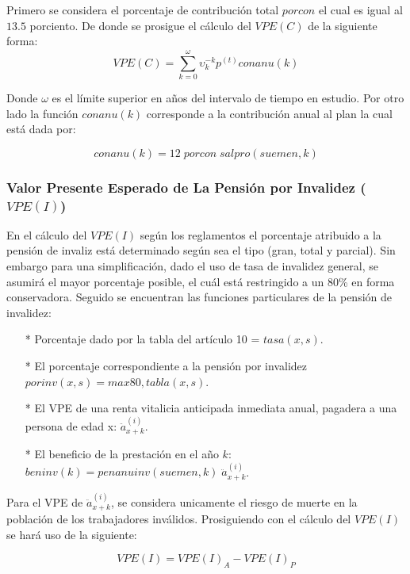 \documentclass[12pt,letterpaper,titlepage]{article}
\begin{document}
Primero se considera el porcentaje de contribución total $porcon$ el cual es igual al $13.5$ porciento. De donde se prosigue el cálculo del $V\!PE(C)$ de la siguiente forma:
\begin{equation*}
V\!PE(C)=\sum \limits_{k=0}^\omega \upsilon^{-k}_{k}p^{(t)} conanu(k)
\end{equation*}

Donde $\omega$ es el límite superior en años del intervalo de tiempo en estudio. Por otro lado la función $conanu(k)$ corresponde a la contribución anual al plan la cual está dada por:

\begin{equation*}
conanu(k)=12\;porcon\;sal\!pro(suemen,k)
\end{equation*}

\subsubsection{Valor Presente Esperado de La Pensión por Invalidez ($V\!PE(I)$)}

En el cálculo del $V\!PE(I)$ según los reglamentos el porcentaje atribuido a la pensión de invaliz está determinado según sea el tipo (gran, total y parcial). Sin embargo para una simplificación, dado el uso de tasa de invalidez general, se asumirá el mayor porcentaje posible, el cuál está restringido a un 80\% en forma conservadora. Seguido se encuentran las funciones particulares de la pensión de invalidez:

\begin{itemize}
	\item [*] Porcentaje dado por la tabla del artículo 10 = $tasa(x,s)$.
	\item [*] El porcentaje correspondiente a la pensión por invalidez $porinv(x,s)=max{80, tabla(x,s)}$.
	\item [*] El VPE de una renta vitalicia anticipada inmediata anual, pagadera a una persona de edad x: $\ddot{a}^{(i)}_{x+k}$.  
	\item [*] El beneficio de la  prestación en el año $k$: $beninv(k)=penanuinv(suemen,k)\;\ddot{a}^{(i)}_{x+k}$.
\end{itemize}

Para el VPE de $\ddot{a}^{(i)}_{x+k}$, se considera unicamente el riesgo de muerte en la población de los trabajadores inválidos. Prosiguiendo con el cálculo del $V\!PE(I)$ se hará uso de la siguiente:

\begin{equation*}
V\!PE(I)=V\!PE(I)_{A}-V\!PE(I)_{P}
\end{equation*}
\end{document}
